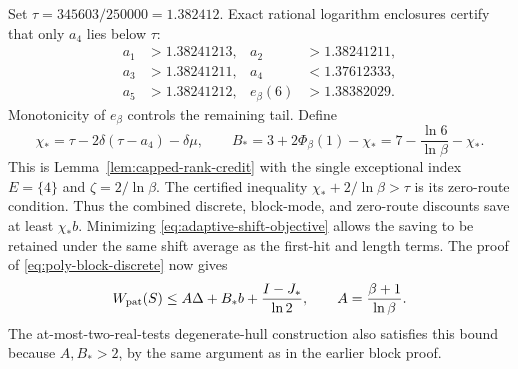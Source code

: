 Set $\tau=345603/250000=1.382412$. Exact rational logarithm
enclosures certify that only $a_4$ lies below $\tau$:
\[
 \begin{aligned}
 a_1&>1.38241213,& a_2&>1.38241211,\\
 a_3&>1.38241211,& a_4&<1.37612333,\\
 a_5&>1.38241212,& e_\beta(6)&>1.38382029.
 \end{aligned}
\]
Monotonicity of $e_\beta$ controls the remaining tail. Define
\begin{equation}\label{eq:adaptive-chi-B}
 \chi_* =\tau-2\delta(\tau-a_4)-\delta\mu,\qquad
 B_* =3+2\Phi_\beta(1)-\chi_*
      =7-\frac{\ln6}{\ln\beta}-\chi_*.
\end{equation}
This is Lemma~\ref{lem:capped-rank-credit} with the single
exceptional index $E=\{4\}$ and $\zeta=2/\ln\beta$.
The certified inequality $\chi_*+2/\ln\beta>\tau$ is its
zero-route condition. Thus the combined discrete, block-mode, and
zero-route discounts save at least $\chi_*b$.
Minimizing \eqref{eq:adaptive-shift-objective} allows the saving to
be retained under the same shift average as the first-hit and length
terms. The proof of \eqref{eq:poly-block-discrete} now gives
\begin{equation}\label{eq:adaptive-local}
 W_{\rm pat}(S)\le A\Delta+B_*b+\frac{I-J_*}{\ln2},
 \qquad A=\frac{\beta+1}{\ln\beta}.
\end{equation}
The at-most-two-real-tests degenerate-hull construction also satisfies
this bound because $A,B_*>2$, by the same argument as in the earlier
block proof.

